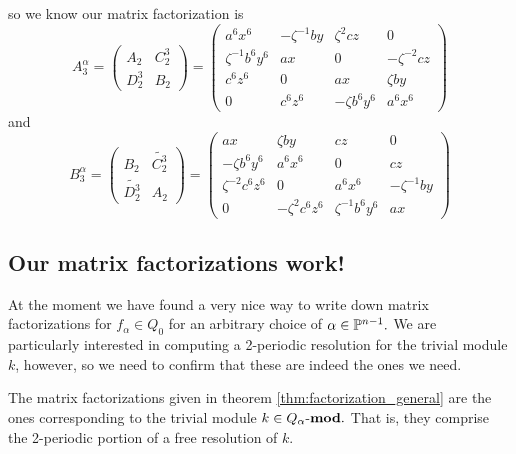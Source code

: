 \documentclass [11pt, proquest] {uwthesis}[2020/02/24]
\begin{document}
    so we know our matrix factorization is
    \[A_3^\alpha=\begin{pmatrix}
        A_{2} & C_{2}^3\\D_{2}^3& B_{2}
    \end{pmatrix}=\begin{pmatrix}
        a^6x^{6} & -\zeta^{-1}by& \zeta^2cz & 0\\ 
        \zeta^{-1} b^6y^{6} & ax&0&-\zeta^{-2}cz\\
        c^6z^6 & 0&ax & \zeta by\\
        0& c^6z^6&-\zeta b^6y^{6} & a^6x^{6}
    \end{pmatrix}\]
    and
    \[B_3^\alpha=\begin{pmatrix}
        B_{2}&\widetilde{C_{2}^3}\\ \widetilde{D_{2}^3} & A_{2}
    \end{pmatrix}=\begin{pmatrix}
        ax & \zeta by&cz & 0\\ 
        -\zeta b^6y^{6} & a^6x^{6}&0& cz\\
         \zeta^{-2}c^6z^6&0&a^6x^{6} & -\zeta^{-1} by\\
         0&-\zeta^2c^6z^6&\zeta^{-1} b^6y^{6} & ax
    \end{pmatrix}\]
    
\subsection{Our matrix factorizations work!}
    At the moment we have found a very nice way to write down matrix factorizations for $f_\alpha\in Q_0$ for an arbitrary choice of $\alpha\in\mathbb{P}^{n-1}.$ We are particularly interested in computing a 2-periodic resolution for the trivial module $k$, however, so we need to confirm that these are indeed the ones we need.
    
    \begin{conj}
        The matrix factorizations given in theorem \ref{thm:factorization_general} are the ones corresponding to the trivial module $k\in Q_\alpha\text{-}\mathbf{mod}.$ That is, they comprise the 2-periodic portion of a free resolution of $k$.
    \end{conj}
    
\end{document}
